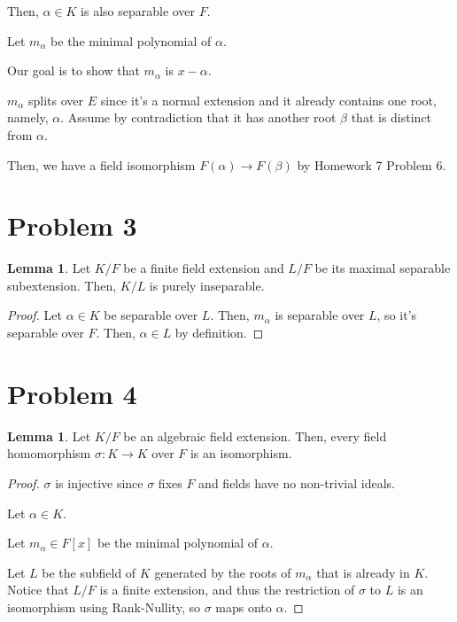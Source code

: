\documentclass{article}
\theoremstyle{definition}
\newtheorem{lemma}[theorem]{Lemma}
\begin{document}
Then, $ \alpha \in K $ is also separable over $ F $.

Let $ m_{\alpha} $ be the minimal polynomial of $ \alpha $.

Our goal is to show that $ m_{\alpha} $ is $ x - \alpha $.

$ m_{\alpha} $ splits over $ E $ since it's a normal extension and it already contains
one root, namely, $ \alpha $. Assume by contradiction that it has another root $ \beta $
that is distinct from $ \alpha $.

Then, we have a field isomorphism $ F(\alpha) \to F(\beta) $ by Homework 7 Problem 6.


 
\section{Problem 3}

\begin{lemma}
    Let $ K/F $ be a finite field extension and $ L/F $ be its maximal separable subextension.
    Then, $ K/L $ is purely inseparable.
\end{lemma}
\begin{proof}
    Let $ \alpha \in K $ be separable over $ L $.
    Then, $ m_{\alpha} $ is separable over $ L $, so it's separable over $ F $.
    Then, $ \alpha \in L $ by definition.
\end{proof}

\section{Problem 4}

\begin{lemma}
    Let $ K/F $ be an algebraic field extension. Then, every field homomorphism $ \sigma: K \to K $
    over $ F $ is an isomorphism.
\end{lemma}
\begin{proof}
    $ \sigma $ is injective since $ \sigma $ fixes $ F $ and fields have no non-trivial ideals.

    Let $ \alpha \in K $.

    Let $ m_{\alpha} \in F[x] $ be the minimal polynomial of $ \alpha $.

    Let $ L $ be the subfield of $ K $ generated by the roots of $ m_{\alpha} $ that
    is already in $ K $. Notice that $ L/F $ is a finite extension, and thus the
    restriction of $ \sigma $ to $ L $ is an isomorphism using Rank-Nullity, so $ \sigma $ maps onto $ \alpha $.
\end{proof}
\end{document}
